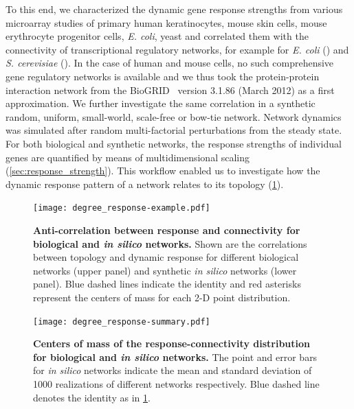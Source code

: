 To this end, we characterized the dynamic gene response strengths from 
various microarray studies of primary human keratinocytes, mouse skin
cells, mouse erythrocyte progenitor cells, \emph{E. coli}, yeast and
correlated them with the connectivity of
transcriptional regulatory networks, for example for \emph{E. coli} 
(\citealp{Gama-Castro2008}) 
and \emph{S. cerevisiae} (\citealp{Balaji2006}). In the case of human and
mouse cells, no such comprehensive gene regulatory networks is available
and we thus took the protein-protein interaction network from 
the BioGRID~%
\citep{Stark2006} version 3.1.86 (March 2012) as a first approximation. 
We further investigate the same correlation in a synthetic random,
uniform, small-world, scale-free or bow-tie network. Network dynamics was simulated after 
random 
multi-factorial perturbations from the steady state. 
For both biological and synthetic networks, the response 
strengths of individual genes are quantified by means of multidimensional 
scaling (\ref{sec:response_strength}). 
This workflow enabled us to investigate how the dynamic
response pattern of a network relates to its topology (\ref{fig:degree_response_example}). 

\begin{figure}[!ht]
\begin{center}
\texttt{[image: degree\_response-example.pdf]}
\end{center}
\caption[Anti-correlation between response and connectivity]{
{\bf Anti-correlation between response and connectivity for biological and 
\emph{in silico} networks.} 
Shown are the correlations between topology and dynamic response for different
biological networks (upper panel) and synthetic \emph{in silico} networks
(lower panel). Blue dashed lines indicate the identity and red asterisks 
represent the centers of mass for each 2-D point distribution.
}
\label{fig:degree_response_example}
\end{figure}

\begin{figure}[!ht]
\begin{center}
\texttt{[image: degree\_response-summary.pdf]}
\end{center}
\caption[Comparison between biological and \emph{in silico} networks]{
{\bf Centers of mass of the response-connectivity distribution for biological
and \emph{in silico} networks.} 
The point and error bars for \emph{in silico} networks indicate the mean
and standard deviation of 1000 realizations of different networks respectively.
Blue dashed line denotes the identity as in \ref{fig:degree_response_example}.
}
\label{fig:degree_response_summary}
\end{figure}


